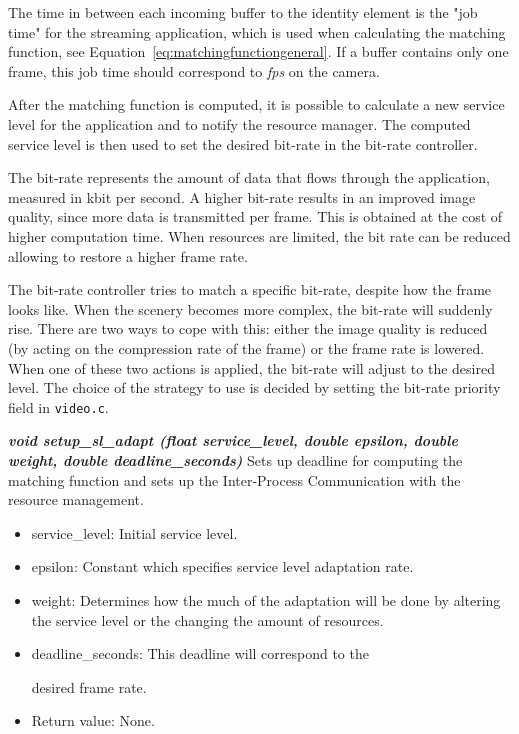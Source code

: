 \documentclass[nobiblatex]{LTHthesis}
\begin{document}
The time in between each incoming buffer to the identity element is the "job time" for the streaming application, 
which is used when calculating the matching function, see Equation~\eqref{eq:matchingfunctiongeneral}. 
If a buffer contains only one frame, this job time should correspond to \emph{fps} on the camera.

After the matching function is computed, it is possible to calculate a new
service level for the application and to notify the resource manager. The
computed service level is then used to set the desired bit-rate in the 
bit-rate controller.

The bit-rate represents the amount of data that flows through the
application, measured in kbit per second. A higher bit-rate results in an
improved image quality, since more data is transmitted per frame. This is
obtained at the cost of higher computation time. When resources are limited,
the bit rate can be reduced allowing to restore a higher frame rate.

The bit-rate controller tries to match a specific bit-rate, despite how
the frame looks like. When the scenery becomes more complex, the bit-rate
will suddenly rise. There are two ways to cope with this: either the image
quality is reduced (by acting on the compression rate of the frame) or 
the frame rate is lowered. When one of these two actions is applied, the 
bit-rate will adjust to the desired level. The choice of the strategy to 
use is decided by setting the bit-rate priority field in \texttt{video.c}.

\begin{framed}
	\begin{flushleft}	
		\emph{\textbf{{void setup\_sl\_adapt \newline
    (float service\_level, double epsilon, double weight, double deadline\_seconds)}}} \newline
		Sets up deadline for computing the matching function and sets up the 
    Inter-Process Communication with the resource management.
		\begin{itemize}
		\item service\_level: Initial service level.
		\item epsilon: Constant which specifies service level adaptation rate.
		\item weight: Determines how the much of the adaptation will be done 
      by altering the service level or the changing the amount of resources.
		\item deadline\_seconds: This deadline will correspond to the 

      desired frame rate.
		\item Return value: None.
	\end{itemize}
	\end{flushleft}
\end{framed}
\end{document}
